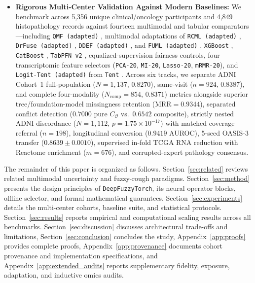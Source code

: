 \documentclass[10pt,twocolumn]{article}
\begin{document}
\begin{itemize}[leftmargin=1.3em,itemsep=1pt,topsep=2pt]
    float32 dictionaries and $2.384 \times 10^{-7}$ ($\le 2.39 \times 10^{-7}$) when parsed
    directly from human-readable 8-decimal \texttt{IF--THEN} text rules via
    \texttt{evaluate\_\allowbreak exported\_\allowbreak rules\_\allowbreak text()}.
    \item \textbf{Rigorous Multi-Center Validation Against Modern Baselines:} We benchmark
    across 5,356 unique clinical/oncology participants and 4,849 histopathology records against
    fourteen multimodal and tabular comparators---including \texttt{QMF (adapted)}
    \cite{zhang2023provable},
    multimodal adaptations of \texttt{RCML (adapted)} \cite{xu2024reliable},
    \texttt{DrFuse (adapted)}
    \cite{yao2024drfuse}, \texttt{DDEF (adapted)} \cite{shao2024dual}, and \texttt{FUML
    (adapted)}
    \cite{duan2025fuml}, \texttt{XGBoost} \cite{chen2016xgboost}, \texttt{CatBoost}
    \cite{prokhorenkova2018catboost}, \texttt{TabPFN~v2} \cite{hollmann2025tabpfn},
    equalized-supervision fairness controls, four transcriptomic feature selectors
    (\texttt{PCA-20}, \texttt{MI-20}, \texttt{Lasso-20}, \texttt{mRMR-20}), and
    \texttt{Logit-Tent (adapted)} from \texttt{Tent} \cite{wang2021tent}. Across six tracks, we
    separate ADNI Cohort~1 full-population ($N=1,137$, $0.8270$), same-visit ($n=924$,
    $0.8387$), and complete four-modality ($N_{\text{comp}}=854$, $0.8371$) metrics alongside
    superior tree/foundation-model missingness retention ($\text{MRR}=0.9344$), separated
    conflict detection ($0.7000$ pure $C_{\mathcal{O}}$ vs.\ $0.6542$ composite), strictly
    nested
    ADNI discordance ($N=1,112$, $p=1.75\times 10^{-17}$) with matched-coverage referral
    ($n=198$), longitudinal conversion ($0.9419$ AUROC), 5-seed OASIS-3 transfer ($0.8639\pm
    0.0010$), supervised in-fold TCGA RNA reduction with Reactome enrichment ($m=676$), and
    corrupted-expert pathology consensus.
\end{itemize}

The remainder of this paper is organized as follows. Section~\ref{sec:related} reviews related
multimodal uncertainty and fuzzy-rough paradigms. Section~\ref{sec:method} presents the design
principles of \texttt{DeepFuzzyTorch}, its neural operator blocks, offline selector, and formal
mathematical guarantees. Section~\ref{sec:experiments} details the multi-center cohorts,
baseline suite, and statistical protocols. Section~\ref{sec:results} reports empirical and
computational scaling results across all benchmarks. Section~\ref{sec:discussion} discusses
architectural trade-offs and limitations, Section~\ref{sec:conclusion} concludes the study,
Appendix~\ref{app:proofs} provides complete proofs, Appendix~\ref{app:provenance} documents
cohort provenance and implementation specifications, and Appendix~\ref{app:extended_audits}
reports supplementary fidelity, exposure, adaptation, and inductive omics audits.
\end{document}

